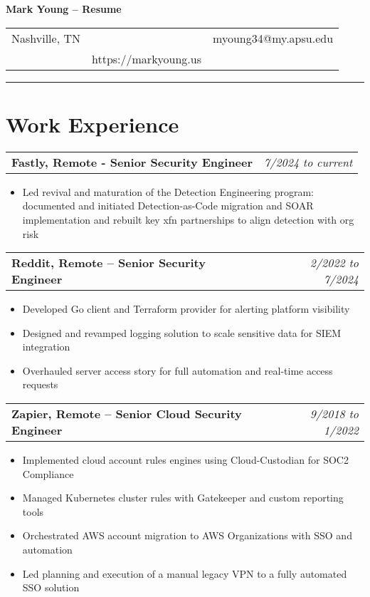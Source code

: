 \documentclass[a4paper,10pt]{article}
\makeatletter
\newcommand{\workentry}[2]{%
  \noindent\begin{tabular*}{\textwidth}{@{\extracolsep{\fill}}lr}
  #1 & \textit{#2} \\
  \end{tabular*}
}
\makeatother
\begin{document}
\vspace*{-40pt} %
\begin{center}
      {\LARGE \textbf{Mark Young -- Resume}}\\[6pt]
\end{center}

\begin{center}
    \begin{tabular}{l c r}
        Nashville, TN & & myoung34@my.apsu.edu \\
        & {https://markyoung.us} & \\
    \end{tabular}
    \hrule height 1pt %
\end{center}

\vspace{4pt}

\section*{Work Experience}

\workentry{\textbf{Fastly, Remote - Senior Security Engineer}}{7/2024 to current}
\begin{itemize}
  \item Led revival and maturation of the Detection Engineering program: documented and initiated Detection-as-Code migration and SOAR implementation and rebuilt key xfn partnerships to align detection with org risk
\end{itemize}

\workentry{\textbf{Reddit, Remote – Senior Security Engineer}}{2/2022 to 7/2024}
\begin{itemize}
  \item Developed Go client and Terraform provider for alerting platform visibility
  \item Designed and revamped logging solution to scale sensitive data for SIEM integration
  \item Overhauled server access story for full automation and real-time access requests
\end{itemize}

\workentry{\textbf{Zapier, Remote – Senior Cloud Security Engineer}}{9/2018 to 1/2022}
\begin{itemize}
  \item Implemented cloud account rules engines using Cloud-Custodian for SOC2 Compliance
  \item Managed Kubernetes cluster rules with Gatekeeper and custom reporting tools
  \item Orchestrated AWS account migration to AWS Organizations with SSO and automation
  \item Led planning and execution of a manual legacy VPN to a fully automated SSO solution
\end{itemize}
\end{document}

